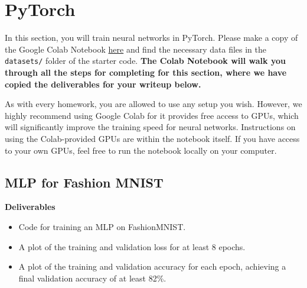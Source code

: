 \documentclass{article}
\newcommand{\Question}[1]{\Large \section{ #1 } \normalsize}
\begin{document}
\newpage
\Question{PyTorch}
In this section, you will train neural networks in PyTorch. 
Please make a copy of the Google Colab Notebook \href{https://colab.research.google.com/drive/1CYrntMond0Q8hw2UWS_N2sBwwDW2xhbn?usp=sharing}{here} and find the necessary data files in the \texttt{datasets/} folder of the starter code. 
\textbf{The Colab Notebook will walk you through all the steps for completing for this section, where we have copied the deliverables for your writeup below.}

As with every homework, you are allowed to use any setup you wish. 
However, we highly recommend using Google Colab for it provides free access to GPUs, which will significantly improve the training speed for neural networks. 
Instructions on using the Colab-provided GPUs are within the notebook itself. 
If you have access to your own GPUs, feel free to run the notebook locally on your computer.

\subsection{MLP for Fashion MNIST}
\textbf{Deliverables}
\begin{itemize}
    \item 
    Code for training an MLP on FashionMNIST.
    \item 
    A plot of the training and validation loss for at least 8 epochs.
    \item 
    A plot of the training and validation accuracy for each epoch, achieving a final validation accuracy of at least 82\%.
\end{itemize}
\end{document}
